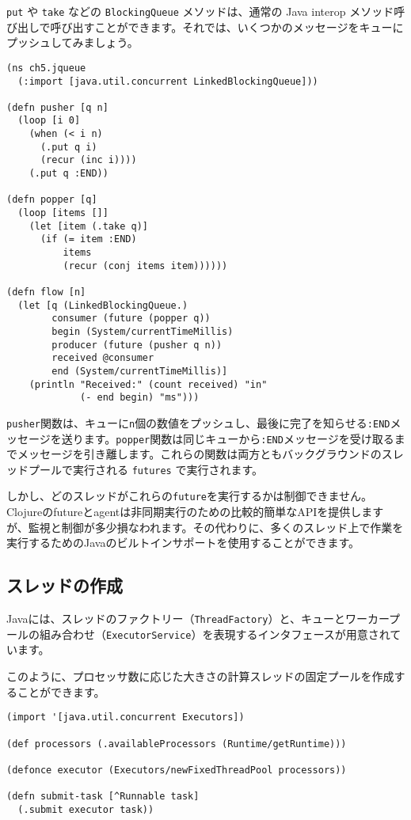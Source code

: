 \texttt{put} や \texttt{take} などの \texttt{BlockingQueue} メソッドは、通常の Java interop メソッド呼び出しで呼び出すことができます。それでは、いくつかのメッセージをキューにプッシュしてみましょう。

\begin{lstlisting}[numbers=none]
(ns ch5.jqueue
  (:import [java.util.concurrent LinkedBlockingQueue]))

(defn pusher [q n]
  (loop [i 0]
    (when (< i n)
      (.put q i)
      (recur (inc i))))
    (.put q :END))

(defn popper [q]
  (loop [items []]
    (let [item (.take q)]
      (if (= item :END)
          items
          (recur (conj items item))))))

(defn flow [n]
  (let [q (LinkedBlockingQueue.)
        consumer (future (popper q))
        begin (System/currentTimeMillis)
        producer (future (pusher q n))
        received @consumer
        end (System/currentTimeMillis)]
    (println "Received:" (count received) "in"
             (- end begin) "ms")))
\end{lstlisting}

\texttt{pusher}関数は、キューに\texttt{n}個の数値をプッシュし、最後に完了を知らせる\texttt{:END}メッセージを送ります。\texttt{popper}関数は同じキューから\texttt{:END}メッセージを受け取るまでメッセージを引き離します。これらの関数は両方ともバックグラウンドのスレッドプールで実行される \texttt{futures} で実行されます。

しかし、どのスレッドがこれらの\texttt{future}を実行するかは制御できません。Clojureのfutureとagentは非同期実行のための比較的簡単なAPIを提供しますが、監視と制御が多少損なわれます。その代わりに、多くのスレッド上で作業を実行するためのJavaのビルトインサポートを使用することができます。

\subsection{スレッドの作成}

Javaには、スレッドのファクトリー（\texttt{ThreadFactory}）と、キューとワーカープールの組み合わせ（\texttt{ExecutorService}）を表現するインタフェースが用意されています。

このように、プロセッサ数に応じた大きさの計算スレッドの固定プールを作成することができます。


\begin{lstlisting}[numbers=none]
(import '[java.util.concurrent Executors])

(def processors (.availableProcessors (Runtime/getRuntime)))

(defonce executor (Executors/newFixedThreadPool processors))

(defn submit-task [^Runnable task]
  (.submit executor task))
\end{lstlisting}

